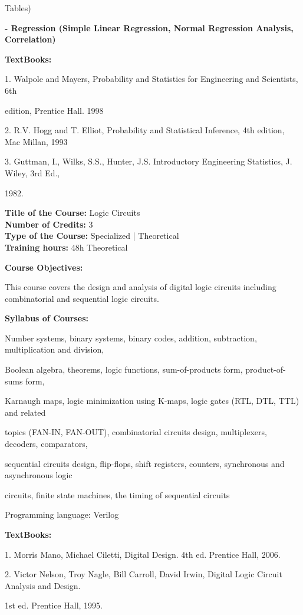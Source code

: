\documentclass[12pt,a4paper]{article}
\begin{document}
Tables)\par
\vspace{2pt}\textbf{- Regression (Simple Linear Regression, Normal Regression Analysis, Correlation)}\par\vspace{4pt}
\textbf{TextBooks:}\par\vspace{2pt}
1. Walpole and Mayers, Probability and Statistics for Engineering and Scientists, 6th\par
edition, Prentice Hall. 1998\par
2. R.V. Hogg and T. Elliot, Probability and Statistical Inference, 4th edition, Mac Millan, 1993\par
3. Guttman, I., Wilks, S.S., Hunter, J.S. Introductory Engineering Statistics, J. Wiley, 3rd Ed.,\par
1982.\par
\vspace{4pt}

\newpage
\textbf{Title of the Course:} Logic Circuits\\
\textbf{Number of Credits:} 3\\
\textbf{Type of the Course:} Specialized | Theoretical\\
\textbf{Training hours:} 48h Theoretical\par\vspace{4pt}
\textbf{Course Objectives:}\par\vspace{2pt}
This course covers the design and analysis of digital logic circuits including combinatorial and
sequential logic circuits.\par\vspace{4pt}
\textbf{Syllabus of Courses:}\par\vspace{2pt}
Number systems, binary systems, binary codes, addition, subtraction, multiplication and division,\par
Boolean algebra, theorems, logic functions, sum-of-products form, product-of-sums form,\par
Karnaugh maps, logic minimization using K-maps, logic gates (RTL, DTL, TTL) and related\par
topics (FAN-IN, FAN-OUT), combinatorial circuits design, multiplexers, decoders, comparators,\par
sequential circuits design, flip-flops, shift registers, counters, synchronous and asynchronous logic\par
circuits, finite state machines, the timing of sequential circuits\par
Programming language: Verilog\par\vspace{4pt}
\textbf{TextBooks:}\par\vspace{2pt}
1. Morris Mano, Michael Ciletti, Digital Design. 4th ed. Prentice Hall, 2006.\par
2. Victor Nelson, Troy Nagle, Bill Carroll, David Irwin, Digital Logic Circuit Analysis and Design.\par
1st ed. Prentice Hall, 1995.\par
\vspace{4pt}
\end{document}
